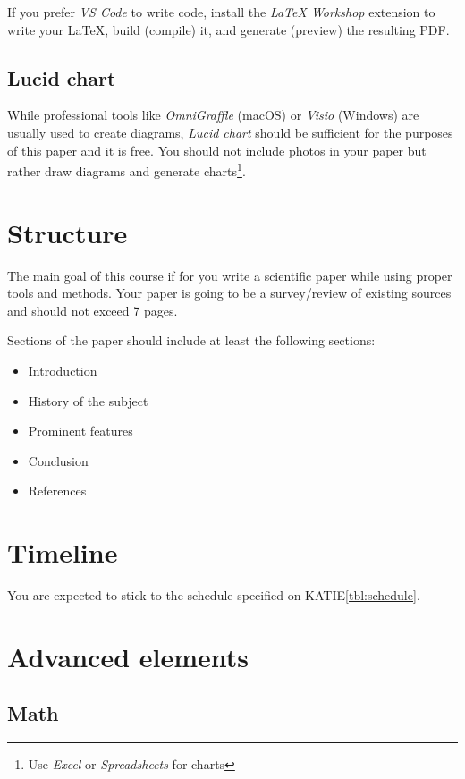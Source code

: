 \documentclass[11pt]{sigplanconf}
\begin{document}
If you prefer \textit{VS Code} to write code, install the \textit{LaTeX Workshop} extension to write your \LaTeX, build (compile) it, and generate (preview) the resulting PDF.

\subsection{Lucid chart}

While professional tools like \textit{OmniGraffle} (macOS) or \textit{Visio} (Windows) are usually used to create diagrams, \textit{Lucid chart}\cite{OnlineDi2:online} should be sufficient for the purposes of this paper and it is free. You should not include photos in your paper but rather draw diagrams and generate charts\footnote{Use \textit{Excel} or \textit{Spreadsheets} for charts}.

\section{Structure}

The main goal of this course if for you write a scientific paper while using proper tools and methods. Your paper is going to be a survey/review of existing sources and should not exceed 7 pages.

Sections of the paper should include at least the following sections:

\begin{itemize}
    \item Introduction
    \item History of the subject
    \item Prominent features
    \item Conclusion
    \item References
\end{itemize}

\section{Timeline}

You are expected to stick to the schedule specified on KATIE\ref{tbl:schedule}.

\section{Advanced elements}

\subsection{Math}
\end{document}
